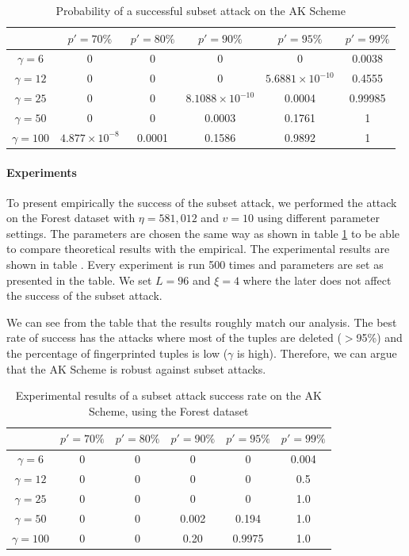 \begin{table}[ht]
\centering
\caption{Probability of a successful subset attack on the AK Scheme}
\label{table:subset-attack-ak}
\begin{tabular}{|c|c|c|c|c|c|} 
 \hline
 & \textbf{$p'=70\%$} & \textbf{$p'=80\%$} & \textbf{$p'=90\%$} & \textbf{$p'=95\%$} & \textbf{$p'=99\%$}\\
 \hline
 $\gamma=6$ & 0 & 0 & 0 & 0 & 0.0038 \\
 \hline
 $\gamma=12$ & 0 & 0 & 0 & $5.6881 \times 10^{-10}$ & 0.4555 \\
 \hline
 $\gamma=25$ & 0 & 0 & $8.1088\times 10^{-10}$ & 0.0004 & 0.99985 \\
 \hline
 $\gamma=50$ & 0 & 0 & 0.0003 & 0.1761 & 1 \\
 \hline
  $\gamma=100$ & $4.877\times 10^{-8}$ & 0.0001 & 0.1586 & 0.9892 & 1 \\
 \hline
\end{tabular}
\end{table}


\paragraph{Experiments}
To present empirically the success of the subset attack, we performed the attack on the Forest dataset with $\eta = 581,012$ and $v=10$ using different parameter settings. 
The parameters are chosen the same way as shown in table \ref{table:subset-attack-ak} to be able to compare theoretical results with the empirical.
The experimental results are shown in table .
Every experiment is run 500 times and parameters are set as presented in the table. 
We set $L=96$ and $\xi=4$ where the later does not affect the success of the subset attack.

We can see from the table  that the results roughly match our analysis. 
The best rate of success has the attacks where most of the tuples are deleted ($>$95\%) and the percentage of fingerprinted tuples is low ($\gamma$ is high). 
Therefore, we can argue that the AK Scheme is robust against subset attacks. 

\begin{table}[ht]
\centering
\caption{Experimental results of a subset attack success rate on the AK Scheme, using the Forest dataset}
\label{table:subset-attack-ak-emp}
\begin{tabular}{|c|c|c|c|c|c|} 
 \hline
 & \textbf{$p'=70\%$} & \textbf{$p'=80\%$} & \textbf{$p'=90\%$} & \textbf{$p'=95\%$} & \textbf{$p'=99\%$}\\
 \hline
 $\gamma=6$ & 0 & 0 & 0 & 0 & 0.004 \\
 \hline
 $\gamma=12$ & 0 & 0 & 0 & 0 & 0.5 \\
 \hline
 $\gamma=25$ & 0 & 0 & 0 & 0 & 1.0 \\
 \hline
 $\gamma=50$ & 0 & 0 & 0.002  & 0.194 &  1.0 \\
 \hline
  $\gamma=100$ & 0 & 0 & 0.20 & 0.9975 &  1.0 \\
 \hline
\end{tabular}
\end{table}


